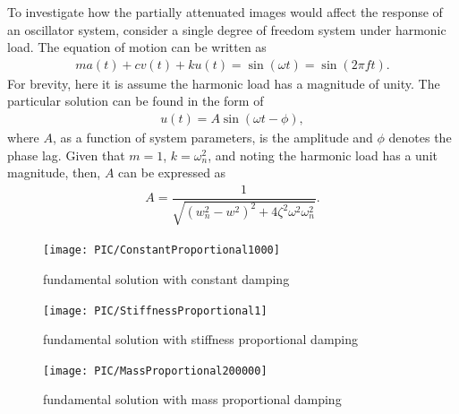 To investigate how the partially attenuated images would affect the response of an oscillator system, consider a single degree of freedom system under harmonic load. The equation of motion can be written as
\begin{gather}
ma\left(t\right)+cv\left(t\right)+ku\left(t\right)=\sin\left(\omega{}t\right)=\sin\left(2\pi{}ft\right).
\end{gather}
For brevity, here it is assume the harmonic load has a magnitude of unity. The particular solution can be found in the form of
\begin{gather}
u\left(t\right)=A\sin\left(\omega{}t-\phi\right),
\end{gather}
where $A$, as a function of system parameters, is the amplitude and $\phi$ denotes the phase lag. Given that $m=1$, $k=\omega_n^2$, and noting the harmonic load has a unit magnitude, then, $A$ can be expressed as
\begin{gather}
A=\dfrac{1}{\sqrt{\left(w_n^2-w^2\right)^2+4\zeta^2\omega^2\omega_n^2}}.
\end{gather}


\begin{figure}[H]
\centering
\texttt{[image: PIC/ConstantProportional1000]}
\caption{fundamental solution with constant damping}\label{fig:constant_damping}
\end{figure}

\begin{figure}[H]
\centering
\texttt{[image: PIC/StiffnessProportional1]}
\caption{fundamental solution with stiffness proportional damping}\label{fig:k_proportional}
\end{figure}

\begin{figure}[H]
\centering
\texttt{[image: PIC/MassProportional200000]}
\caption{fundamental solution with mass proportional damping}\label{fig:m_proportional}
\end{figure}